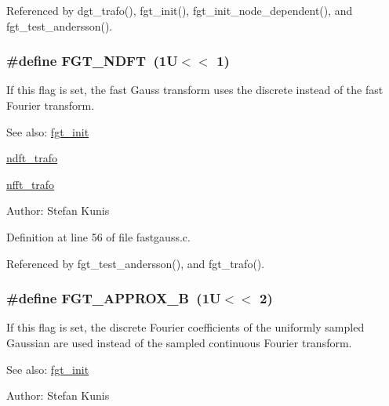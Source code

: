 Referenced by dgt\_\-trafo(), fgt\_\-init(), fgt\_\-init\_\-node\_\-dependent(), and fgt\_\-test\_\-andersson().\hypertarget{group__applications__fastgauss_g38ab7e1022ff3c5b556ce93078a05d1e}{
\subsubsection{\setlength{\rightskip}{0pt plus 5cm}\#define FGT\_\-NDFT~(1U$<$$<$ 1)}}
\label{group__applications__fastgauss_g38ab7e1022ff3c5b556ce93078a05d1e}


If this flag is set, the fast Gauss transform uses the discrete instead of the fast Fourier transform. 

\begin{Desc}
\item[See also:]\hyperlink{group__applications__fastgauss_g44cf9a6fb0a16df875f613f343fd5c65}{fgt\_\-init} 

\hyperlink{group__nfft_g27ef1bcb8dd3a3fc1cdbeee368ec1acf}{ndft\_\-trafo} 

\hyperlink{group__nfft_g9f1e6bd9f7f956a8679e6b413c97b421}{nfft\_\-trafo} \end{Desc}
\begin{Desc}
\item[Author:]Stefan Kunis \end{Desc}


Definition at line 56 of file fastgauss.c.

Referenced by fgt\_\-test\_\-andersson(), and fgt\_\-trafo().\hypertarget{group__applications__fastgauss_g39c3e544a78853e0da2b9a8c66d3054d}{
\subsubsection{\setlength{\rightskip}{0pt plus 5cm}\#define FGT\_\-APPROX\_\-B~(1U$<$$<$ 2)}}
\label{group__applications__fastgauss_g39c3e544a78853e0da2b9a8c66d3054d}


If this flag is set, the discrete Fourier coefficients of the uniformly sampled Gaussian are used instead of the sampled continuous Fourier transform. 

\begin{Desc}
\item[See also:]\hyperlink{group__applications__fastgauss_g44cf9a6fb0a16df875f613f343fd5c65}{fgt\_\-init} \end{Desc}
\begin{Desc}
\item[Author:]Stefan Kunis \end{Desc}


